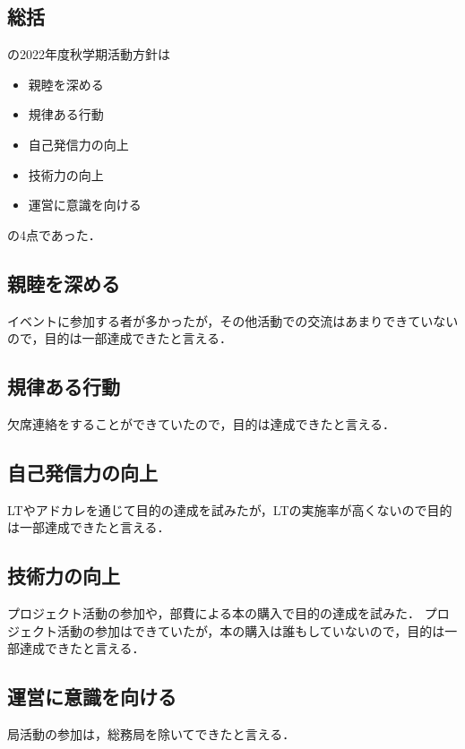 \subsection*{\firstGrade{}総括}


\firstGrade{}の2022年度秋学期活動方針は
\begin{itemize}
    \item 親睦を深める
    \item 規律ある行動
    \item 自己発信力の向上
    \item 技術力の向上
    \item 運営に意識を向ける
\end{itemize}
の4点であった．

\subsection*{親睦を深める}
イベントに参加する者が多かったが，その他活動での交流はあまりできていないので，目的は一部達成できたと言える．

\subsection*{規律ある行動}
欠席連絡をすることができていたので，目的は達成できたと言える．

\subsection*{自己発信力の向上}
LTやアドカレを通じて目的の達成を試みたが，LTの実施率が高くないので目的は一部達成できたと言える．

\subsection*{技術力の向上}
プロジェクト活動の参加や，部費による本の購入で目的の達成を試みた．
プロジェクト活動の参加はできていたが，本の購入は誰もしていないので，目的は一部達成できたと言える．

\subsection*{運営に意識を向ける}
局活動の参加は，総務局を除いてできたと言える．